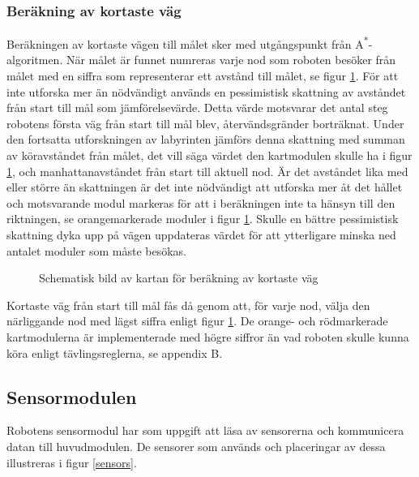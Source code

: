 \documentclass[11pt]{article}
\begin{document}
\begin{flushleft}
\subsubsection{Beräkning av kortaste väg} \label{shortestPath}
Beräkningen av kortaste vägen till målet sker med utgångspunkt från A\textsuperscript{*}-algoritmen. När målet är funnet numreras varje nod som roboten besöker från målet med en siffra som representerar ett avstånd till målet, se figur \ref{path}. För att inte utforska mer än nödvändigt används en pessimistisk skattning av avståndet från start till mål som jämförelsevärde. Detta värde motsvarar det antal steg robotens första väg från start till mål blev, återvändsgränder borträknat. Under den fortsatta utforskningen av labyrinten jämförs denna skattning med summan av köravståndet från målet, det vill säga värdet den kartmodulen skulle ha i figur \ref{path}, och manhattanavståndet från start till aktuell nod. Är det avståndet lika med eller större än skattningen är det inte nödvändigt att utforska mer åt det hållet och motsvarande modul markeras för att i beräkningen inte ta hänsyn till den riktningen, se orangemarkerade moduler i figur \ref{path}. Skulle en bättre pessimistisk skattning dyka upp på vägen uppdateras värdet för att ytterligare minska ned antalet moduler som måste besökas.

\begin{figure}[htbp]
\centering
\noindent\resizebox{0.7\linewidth}{!}{
	}
	\caption{Schematisk bild av kartan för beräkning av kortaste väg}	\label{path}
\end{figure}


Kortaste väg från start till mål fås då genom att, för varje nod, välja den närliggande nod med lägst siffra enligt figur \ref{path}. De orange- och rödmarkerade kartmodulerna är implementerade med högre siffror än vad roboten skulle kunna köra  enligt tävlingsreglerna, se appendix B.

\pagebreak

\subsection{Sensormodulen}
Robotens sensormodul har som uppgift att läsa av sensorerna och kommunicera datan till huvudmodulen. De sensorer som används och placeringar av dessa illustreras i figur \ref{sensors}.
\newline


\end{flushleft}
\end{document}
